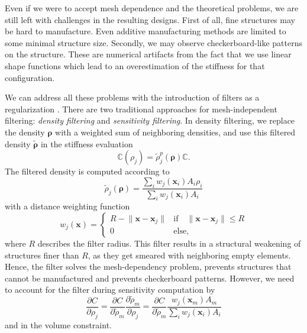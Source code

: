 Even if we were to accept mesh dependence and the theoretical problems, we are still left with challenges in the resulting designs. First of all, fine structures may be hard to manufacture. Even additive manufacturing methods are limited to some minimal structure size. Secondly, we may observe checkerboard-like patterns on the structure. These are numerical artifacts from the fact that we use linear shape functions which lead to an overestimation of the stiffness for that configuration.

We can address all these problems with the introduction of filters as a regularization \cite{Harzheim2014, Lazarov2011}. There are two traditional approaches for mesh-independent filtering: \emph{density filtering} and \emph{sensitivity filtering}. In density filtering, we replace the density $\pmb{\rho}$ with a weighted sum of neighboring densities, and use this filtered density $\tilde{\pmb{\rho}}$ in the stiffness evaluation
\begin{equation}
    \mathbb{C}(\rho_j)= \tilde{\rho}_j^p(\pmb{\rho}) \mathbb{C}.
\end{equation}
The filtered density is computed according to 
\begin{equation}
    \tilde{\rho}_j (\pmb{\rho}) = \frac{\sum_i w_j(\mathbf{x}_i) A_i \rho_i}{\sum_i w_j(\mathbf{x}_i) A_i}
\end{equation}
with a distance weighting function 
\begin{equation}
    w_j(\mathbf{x}) = 
    \begin{cases}
        R-\lVert \mathbf{x} - \mathbf{x}_j\rVert & \text{if} \quad \lVert \mathbf{x} - \mathbf{x}_j\rVert \le R \\
        0 & \text{else},
    \end{cases}
\end{equation}
where $R$ describes the filter radius. This filter results in a structural weakening of structures finer than $R$, as they get smeared with neighboring empty elements. Hence, the filter solves the mesh-dependency problem, prevents structures that cannot be manufactured and prevents checkerboard patterns. However, we need to account for the filter during sensitivity computation by 
\begin{equation}
    \frac{\partial C}{\partial \rho_j} 
    = \frac{\partial C}{\partial \tilde{\rho}_m} \frac{\partial \tilde{\rho}_m}{\partial \rho_j}
    = \frac{\partial C}{\partial \tilde{\rho}_m}  \frac{w_j(\mathbf{x}_m) A_m }{\sum_i w_j(\mathbf{x}_i) A_i}
\end{equation}
and in the volume constraint.

